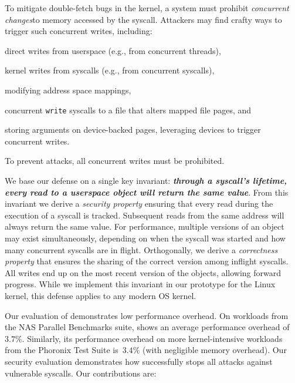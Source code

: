 To mitigate double-fetch bugs in the kernel, a system must prohibit
\emph{concurrent changes}\footnotemark to memory accessed by the syscall. Attackers may
find crafty ways to trigger such concurrent writes, including:
\begin{inparaenum}
\item  direct writes from userspace (e.g., from concurrent threads),
\item  kernel writes from syscalls (e.g., from concurrent syscalls),
\item  modifying address space mappings,
\item  concurrent \texttt{write} syscalls to a file that alters mapped
file pages, and
\item  storing arguments on device-backed pages, leveraging devices to trigger
concurrent writes.
\end{inparaenum}
To prevent attacks, all concurrent writes must be prohibited.

We base our defense on a single key invariant:
\textbf{\emph{through a syscall's lifetime, every read to a userspace object
will return the same value}}. From this invariant we derive a \emph{security
property} ensuring that every read during the execution of a syscall is
tracked. Subsequent reads from the same address will always return the same value.
For performance, multiple versions of an object may exist simultaneously,
depending on when the syscall was started and how many
concurrent syscalls are in flight. 
Orthogonally, we derive a \emph{correctness
property} that ensures the sharing of the correct version among inflight
syscalls. All writes end up on the most recent version of
the objects, allowing forward progress.
While we implement this invariant in our \midas prototype for the Linux kernel,
this defense applies to any modern OS kernel.

Our evaluation of \midas demonstrates low performance overhead.
On workloads from the NAS Parallel Benchmarks suite, \midas shows
an average performance overhead of~$3.7\%$. Similarly, its performance overhead on
more kernel-intensive workloads from the Phoronix Test Suite is~$3.4\%$ (with
negligible memory overhead).
%
Our security evaluation demonstrates how \midas successfully stops all attacks
against vulnerable syscalls.
%
Our contributions are:

